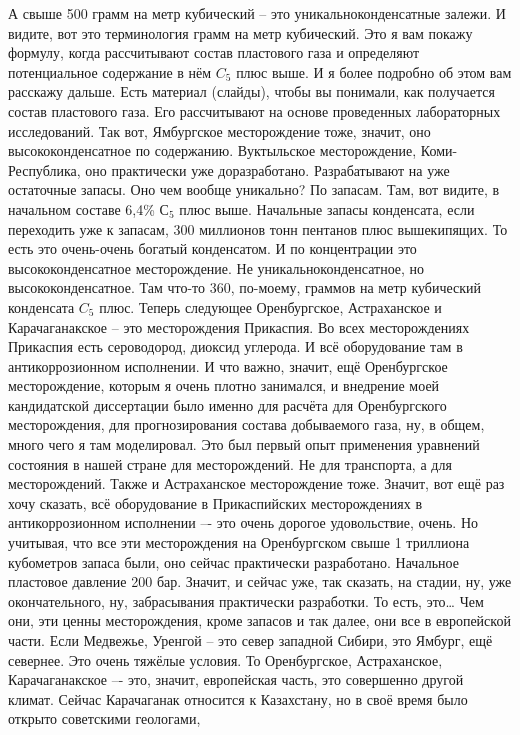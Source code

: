 \documentclass[main.tex]{subfiles}
\begin{document}
А свыше 500 грамм на метр кубический -- это уникальноконденсатные залежи.
И видите, вот это терминология грамм на метр кубический.
Это я вам покажу формулу, когда рассчитывают состав пластового газа и определяют потенциальное содержание в нём $C_5$ плюс выше.
И я более подробно об этом вам расскажу дальше.
Есть материал (слайды), чтобы вы понимали, как получается состав пластового газа.
Его рассчитывают на основе проведенных лабораторных исследований.
Так вот, Ямбургское месторождение тоже, значит, оно высококонденсатное по содержанию.
Вуктыльское месторождение, Коми-Республика, оно практически уже доразработано.
Разрабатывают на уже остаточные запасы.
Оно чем вообще уникально?
По запасам.
Там, вот видите, в начальном составе 6,4\% $С_5$ плюс выше.
Начальные запасы конденсата, если переходить уже к запасам, 300 миллионов тонн пентанов плюс вышекипящих.
То есть это очень-очень богатый конденсатом.
И по концентрации это высококонденсатное месторождение.
Не уникальноконденсатное, но высококонденсатное.
Там что-то 360, по-моему, граммов на метр кубический конденсата $C_5$ плюс.
Теперь следующее Оренбургское, Астраханское и Карачаганакское -- это месторождения Прикаспия.
Во всех месторождениях Прикаспия есть сероводород, диоксид углерода.
И всё оборудование там в антикоррозионном исполнении.
И что важно, значит, ещё Оренбургское месторождение, которым я очень плотно занимался, и внедрение моей кандидатской диссертации было именно для расчёта для Оренбургского месторождения, для прогнозирования состава добываемого газа, ну, в общем, много чего я там моделировал.
Это был первый опыт применения уравнений состояния в нашей стране для месторождений.
Не для транспорта, а для месторождений.
Также и Астраханское месторождение тоже.
Значит, вот ещё раз хочу сказать, всё оборудование в Прикаспийских месторождениях в антикоррозионном исполнении –- это очень дорогое удовольствие, очень.
Но учитывая, что все эти месторождения на Оренбургском свыше 1 триллиона кубометров запаса были, оно сейчас практически разработано.
Начальное пластовое давление 200 бар.
Значит, и сейчас уже, так сказать, на стадии, ну, уже окончательного, ну, забрасывания практически разработки.
То есть, это… Чем они, эти ценны месторождения, кроме запасов и так далее, они все в европейской части.
Если Медвежье, Уренгой – это север западной Сибири, это Ямбург, ещё севернее.
Это очень тяжёлые условия.
То Оренбургское, Астраханское, Карачаганакское –- это, значит, европейская часть,
это совершенно другой климат.
Сейчас Карачаганак относится к Казахстану, но в своё время было открыто советскими геологами,
\end{document}
